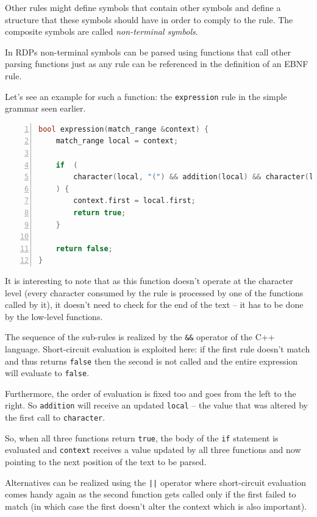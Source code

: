 \documentclass[12pt]{article}
\begin{document}
Other rules might define symbols that contain other symbols and define a structure that these symbols should
have in order to comply to the rule. The composite symbols are called \emph{non-terminal symbols}.

In RDPs non-terminal symbols can be parsed using functions that call other parsing functions just as any rule
can be referenced in the definition of an EBNF rule.

Let's see an example for such a function: the \texttt{expression} rule in the simple grammar seen earlier.

\begin{center}
	\begin{minipage}[h]{0.8\textwidth}
		\begin{lstlisting}[language=C++, breaklines=true, numbers=left]
bool expression(match_range &context) {
	match_range local = context;

	if  (
		character(local, "(") && addition(local) && character(local, ")")
	) {
		context.first = local.first;
		return true;
	}

	return false;
}
		\end{lstlisting}
	\end{minipage}
\end{center}

It is interesting to note that as this function doesn't operate at the character level (every character
consumed by the rule is processed by one of the functions called by it), it doesn't need to check for the end
of the text -- it has to be done by the low-level functions.

The sequence of the sub-rules is realized by the \texttt{\&\&} operator of the C++ language. Short-circuit
evaluation is exploited here: if the first rule doesn't match and thus returns \texttt{false} then the second
is not called and the entire expression will evaluate to \texttt{false}.

Furthermore, the order of evaluation is fixed too and goes from the left to the right. So \texttt{addition}
will receive an updated \texttt{local} -- the value that was altered by the first call to \texttt{character}.

So, when all three functions return \texttt{true}, the body of the \texttt{if} statement is evaluated and
\texttt{context} receives a value updated by all three functions and now pointing to the next position of the
text to be parsed.

Alternatives can be realized using the \texttt{||} operator where short-circuit evaluation comes handy again
as the second function gets called only if the first failed to match (in which case the first doesn't alter
the context which is also important).
\end{document}
